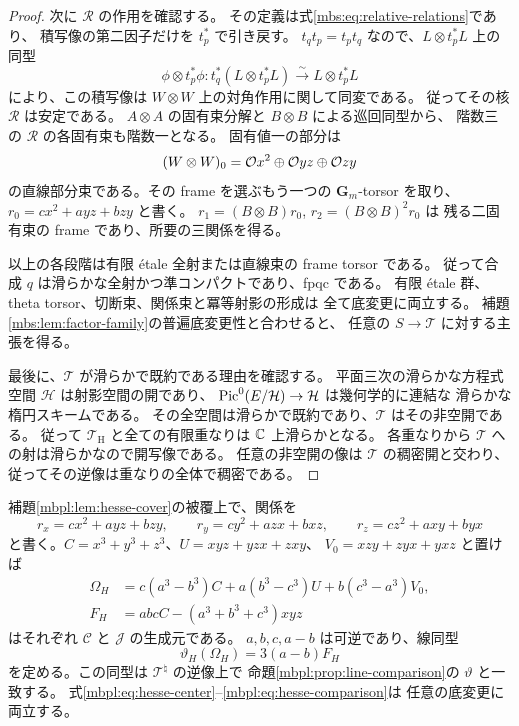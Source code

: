 \begin{proof}
次に $\mathcal R$ の作用を確認する。
その定義は式\eqref{mbs:eq:relative-relations}であり、
積写像の第二因子だけを $t_p^*$ で引き戻す。
$t_qt_p=t_pt_q$ なので、$L\otimes t_p^*L$ 上の同型
\[
 \phi\otimes t_p^*\phi:
 t_q^*(L\otimes t_p^*L)\xrightarrow{\sim}L\otimes t_p^*L
\]
により、この積写像は $W\otimes W$ 上の対角作用に関して同変である。
従ってその核 $\mathcal R$ は安定である。
$A\otimes A$ の固有束分解と $B\otimes B$ による巡回同型から、
階数三の $\mathcal R$ の各固有束も階数一となる。
固有値一の部分は
\[
 (W\otimes W)_0=\mathcal O x^2\oplus\mathcal O yz\oplus\mathcal O zy
\]
の直線部分束である。その frame を選ぶもう一つの
$\mathbf G_m$-torsor を取り、$r_0=cx^2+ayz+bzy$ と書く。
$r_1=(B\otimes B)r_0$, $r_2=(B\otimes B)^2r_0$ は
残る二固有束の frame であり、所要の三関係を得る。

以上の各段階は有限 \'etale 全射または直線束の frame torsor である。
従って合成 $q$ は滑らかな全射かつ準コンパクトであり、fpqc である。
有限 \'etale 群、theta torsor、切断束、関係束と冪等射影の形成は
全て底変更に両立する。
補題\ref{mbs:lem:factor-family}の普遍底変更性と合わせると、
任意の $S\to\mathcal T$ に対する主張を得る。

最後に、$\mathcal T$ が滑らかで既約である理由を確認する。
平面三次の滑らかな方程式空間 $\mathcal H$ は射影空間の開であり、
$\operatorname{Pic}^0(E/\mathcal H)\to\mathcal H$ は幾何学的に連結な
滑らかな楕円スキームである。
その全空間は滑らかで既約であり、$\mathcal T$ はその非空開である。
従って $\mathcal T_{\mathrm H}$ と全ての有限重なりは $\mathbb C$ 上滑らかとなる。
各重なりから $\mathcal T$ への射は滑らかなので開写像である。
任意の非空開の像は $\mathcal T$ の稠密開と交わり、
従ってその逆像は重なりの全体で稠密である。
\end{proof}

\begin{lemma}
\label{mbpl:lem:hesse-center}
補題\ref{mbpl:lem:hesse-cover}の被覆上で、関係を
\begin{equation}\label{mbpl:eq:hesse-relations}
 r_x=cx^2+a yz+b zy,\qquad
 r_y=cy^2+a zx+b xz,\qquad
 r_z=cz^2+a xy+b yx
\end{equation}
と書く。$C=x^3+y^3+z^3$、$U=xyz+yzx+zxy$、
$V_0=xzy+zyx+yxz$ と置けば
\begin{align}
 \Omega_H&=c(a^3-b^3)C+a(b^3-c^3)U+b(c^3-a^3)V_0,
       \label{mbpl:eq:hesse-center}\\
 F_H&=abcC-(a^3+b^3+c^3)xyz
       \label{mbpl:eq:hesse-point}
\end{align}
はそれぞれ $\mathcal C$ と $\mathcal J$ の生成元である。
$a,b,c,a-b$ は可逆であり、線同型
\begin{equation}\label{mbpl:eq:hesse-comparison}
 \vartheta_H(\Omega_H)=3(a-b)F_H
\end{equation}
を定める。この同型は $\mathcal T^\natural$ の逆像上で
命題\ref{mbpl:prop:line-comparison}の $\vartheta$ と一致する。
式\eqref{mbpl:eq:hesse-center}--\eqref{mbpl:eq:hesse-comparison}は
任意の底変更に両立する。
\end{lemma}

